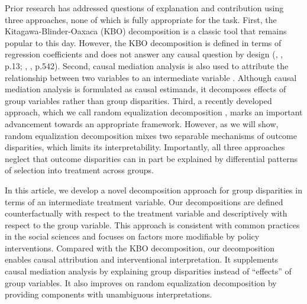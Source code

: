 \documentclass[12pt,a4paper]{article}
\begin{document}
Prior research has addressed questions of explanation and contribution using three approaches, none of which is fully appropriate for the task. 
First, the Kitagawa-Blinder-Oaxaca (KBO) decomposition \citep{kitagawa_components_1955, blinder_wage_1973, oaxaca_male-female_1973} is a classic tool that remains popular to this day. 
However, the KBO decomposition is defined in terms of regression coefficients and does not answer any causal question by design (\citeauthor{fortin_decomposition_2011}, \citeyear{fortin_decomposition_2011}, p.13; \citeauthor{lundberg_what_2021}, \citeyear{lundberg_what_2021}, p.542). Second, causal mediation analysis is also used to attribute the relationship between two variables to an intermediate variable \citep{vanderweele_explanation_2015}. Although causal mediation analysis is formulated as causal estimands, it decomposes effects of group variables rather than group disparities. Third, a recently developed approach, which we call random equalization decomposition \citep{vanderweele_causal_2014, jackson_decomposition_2018, lundberg_gap-closing_2022}, marks an important advancement towards an appropriate framework. However, as we will show, random equalization decomposition mixes two separable mechanisms of outcome disparities, which limits its interpretability. Importantly, all three approaches neglect that outcome disparities can in part be explained by differential patterns of selection into treatment across groups. 

In this article, we develop a novel decomposition approach for group disparities in terms of an intermediate treatment variable. Our decompositions are defined counterfactually with respect to the treatment variable and descriptively with respect to the group variable. This approach is consistent with common practices in the social sciences and focuses on factors more modifiable by policy interventions. Compared with the KBO decomposition, our decomposition enables causal attribution and  interventional interpretation. It supplements causal mediation analysis by explaining group disparities instead of ``effects'' of group variables. It also improves on random equalization decomposition by providing components with unambiguous interpretations.
\end{document}
